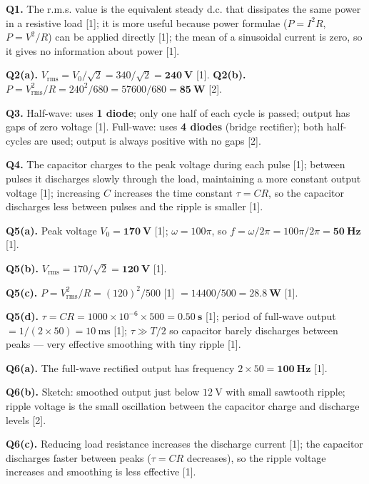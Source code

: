 \begin{markscheme}

\textbf{Q1.} The r.m.s. value is the equivalent steady d.c. that dissipates the same power in a resistive load [1]; it is more useful because power formulae ($P = I^2R$, $P = V^2/R$) can be applied directly [1]; the mean of a sinusoidal current is zero, so it gives no information about power [1].

\vspace{0.5em}\textbf{Q2(a).} $V_{\text{rms}} = V_0/\sqrt{2} = 340/\sqrt{2} = \mathbf{240\ \text{V}}$ [1].
\textbf{Q2(b).} $P = V_{\text{rms}}^2/R = 240^2/680 = 57600/680 = \mathbf{85\ \text{W}}$ [2].

\vspace{0.5em}\textbf{Q3.} Half-wave: uses \textbf{1 diode}; only one half of each cycle is passed; output has gaps of zero voltage [1]. Full-wave: uses \textbf{4 diodes} (bridge rectifier); both half-cycles are used; output is always positive with no gaps [2].

\vspace{0.5em}\textbf{Q4.} The capacitor charges to the peak voltage during each pulse [1]; between pulses it discharges slowly through the load, maintaining a more constant output voltage [1]; increasing $C$ increases the time constant $\tau = CR$, so the capacitor discharges less between pulses and the ripple is smaller [1].

\vspace{0.5em}\textbf{Q5(a).} Peak voltage $V_0 = \mathbf{170\ \text{V}}$ [1]; $\omega = 100\pi$, so $f = \omega/2\pi = 100\pi/2\pi = \mathbf{50\ \text{Hz}}$ [1].

\vspace{0.5em}\textbf{Q5(b).} $V_{\text{rms}} = 170/\sqrt{2} = \mathbf{120\ \text{V}}$ [1].

\vspace{0.5em}\textbf{Q5(c).} $P = V_{\text{rms}}^2/R = (120)^2/500$ [1] $= 14400/500 = \mathbf{28.8\ \text{W}}$ [1].

\vspace{0.5em}\textbf{Q5(d).} $\tau = CR = 1000\times10^{-6}\times500 = \mathbf{0.50\ \text{s}}$ [1]; period of full-wave output $= 1/(2\times50) = 10\ \text{ms}$ [1]; $\tau \gg T/2$ so capacitor barely discharges between peaks — very effective smoothing with tiny ripple [1].

\vspace{0.5em}\textbf{Q6(a).} The full-wave rectified output has frequency $2\times50 = \mathbf{100\ \text{Hz}}$ [1].

\vspace{0.5em}\textbf{Q6(b).} Sketch: smoothed output just below $12\ \text{V}$ with small sawtooth ripple; ripple voltage is the small oscillation between the capacitor charge and discharge levels [2].

\vspace{0.5em}\textbf{Q6(c).} Reducing load resistance increases the discharge current [1]; the capacitor discharges faster between peaks ($\tau = CR$ decreases), so the ripple voltage increases and smoothing is less effective [1].

\end{markscheme}

